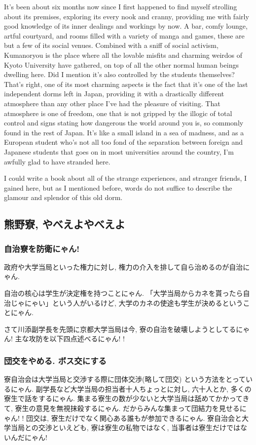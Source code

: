 \documentclass[10pt,b5jsbook,dvips,dvipdfmx,openany]{jsbook}
\theoremstyle{definition}
\begin{document}
		It's been about six months now since I first happened to find myself strolling about its premises, exploring its every nook and cranny, providing me with fairly good knowledge of its inner dealings and workings by now. A bar, comfy lounge, artful courtyard, and rooms filled with a variety of manga and games, these are but a few of its social venues. Combined with a sniff of social activism, Kumanoryou is the place where all the lovable misfits and charming weirdos of Kyoto University have gathered, on top of all the other normal human beings dwelling here. Did I mention it's also controlled by the students themselves? That's right, one of its most charming aspects is the fact that it's one of the last independent dorms left in Japan, providing it with a drastically different atmosphere than any other place I've had the pleasure of visiting. That atmosphere is one of freedom, one that is not gripped by the illogic of total control and signs stating how dangerous the world around you is, so commonly found in the rest of Japan. It's like a small island in a sea of madness, and as a European student who's not all too fond of the separation between foreign and Japanese students that goes on in most universities around the country, I'm awfully glad to have stranded here.

		I could write a book about all of the strange experiences, and stranger friends, I gained here, but as I mentioned before, words do not suffice to describe the glamour and splendor of this old dorm.



		\subsection{熊野寮, やべえよやべえよ}

			\subsubsection{自治寮を防衛にゃん! }
			政府や大学当局といった権力に対し, 権力の介入を排して自ら治めるのが自治にゃん.

			自治の核心は学生が決定権を持つことにゃん. 「大学当局からカネを貰ったら自治じゃにゃい」という人がいるけど, 大学のカネの使途も学生が決めるということにゃん.

			さて川添副学長を先頭に京都大学当局は今, 寮の自治を破壊しようとしてるにゃん! 主な攻防を以下四点述べるにゃん! !

			\subsubsection{団交をやめる. ボス交にする}
			寮自治会は大学当局と交渉する際に団体交渉(略して団交) という方法をとっているにゃん. 副学長など大学当局の担当者十人ちょっとに対し, 六十人とか, 多くの寮生で話をするにゃん. 集まる寮生の数が少ないと大学当局は舐めてかかってきて, 寮生の意見を無視抹殺するにゃん. だからみんな集まって団結力を見せるにゃん! ! 団交は, 寮生だけでなく関心ある誰もが参加できるにゃん. 寮自治会と大学当局との交渉といえども, 寮は寮生の私物ではなく, 当事者は寮生だけではないんだにゃん!
\end{document}
